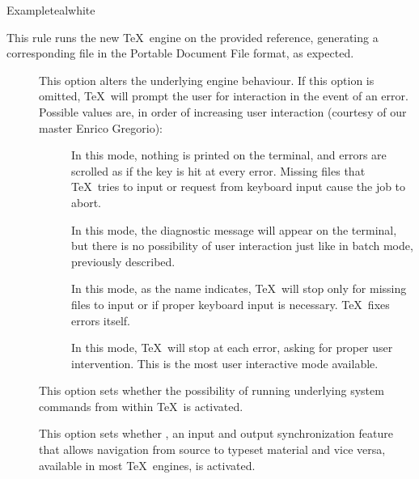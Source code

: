 \begin{description}
\begin{codebox}{Example}{teal}{\icnote}{white}
\end{codebox}

\item[\rulebox{xelatex}{Marco Daniel, Paulo Cereda}] This rule runs the new  \TeX\ engine on the provided  reference, generating a corresponding file in the Portable Document File format, as expected.

\begin{description}
\item[] This option alters the underlying engine behaviour. If this option is omitted, \TeX\ will prompt the user for interaction in the event of an error. Possible values are, in order of increasing user interaction (courtesy of our master Enrico Gregorio):

\begin{description}
\item[] In this mode, nothing is printed on the terminal, and errors are scrolled as if the  key is hit at every error. Missing files that \TeX\ tries to input or request from keyboard input cause the job to abort.

\item[] In this mode, the diagnostic message will appear on the terminal, but there is no possibility of user interaction just like in batch mode, previously described.

\item[] In this mode, as the name indicates, \TeX\ will stop only for missing files to input or if proper keyboard input is necessary. \TeX\ fixes errors itself.

\item[] In this mode, \TeX\ will stop at each error, asking for proper user intervention. This is the most user interactive mode available.
\end{description}

\item[] This option sets whether the possibility of running underlying system commands from within \TeX\ is activated.

\item[] This option sets whether , an input and output synchronization feature that allows navigation from source to typeset material and vice versa, available in most \TeX\ engines, is activated.


\end{description}
\end{description}
